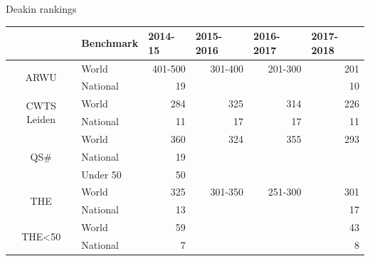 \documentclass[
 size=14pt,
 paper=smartboard,  %
 mode=present, 		%
 display=slides, 	%
 style=tuliplab,  	%
 pauseslide,
 fleqn,leqno]{powerdot}
\begin{document}
\begin{slide}{Deakin rankings}
\begin{table}[htbp]
  \setlength{\abovecaptionskip}{-2pt}
  \setlength{\belowcaptionskip}{12pt}
  \centering
    \begin{tabular}{clrrrr}
    \toprule
      & Benchmark & \multicolumn{1}{l}{2014-15} & \multicolumn{1}{l}{2015-2016} & \multicolumn{1}{l}{2016-2017} & \multicolumn{1}{l}{2017-2018} \\ \midrule
    \multirow{2}[0]{*}{ARWU} & World & 401-500 & 301-400 & 201-300 & 201 \\
      & National  & 19 &   &   & 10 \\
      \midrule  
    \multirow{2}[0]{*}{CWTS Leiden} & World  & 284 & 325 & 314 & 226 \\
      & National  & 11 & 17 & 17 & 11 \\
      \midrule    
    \multirow{3}[0]{*}{QS\#} & World  & 360 & 324 & 355 & 293 \\
      & National & 19 &   &   &  \\
      & Under 50 & 50 &   &   &  \\
      \midrule
    \multirow{2}[0]{*}{THE} & World  & 325 & 301-350 & 251-300 & 301 \\
      & National  & 13 &   &   & 17 \\
      \midrule
    \multirow{2}[0]{*}{THE<50} & World  & 59 &   &   & 43 \\
      & National  & 7 &   &   & 8 \\
      \bottomrule
    \end{tabular}
  \label{tab:Deakin Ranking}
\end{table}
\end{slide}
\end{document}
